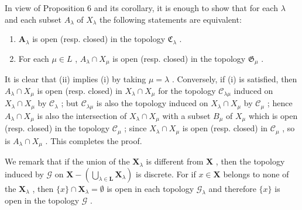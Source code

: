 In view of Proposition 6 and its corollary, it is enough to show that for each \(\lambda\) and each subset \(A_{\lambda}\) of \(X_{\lambda}\) the following statements are equivalent:

\begin{enumerate}
\def\labelenumi{(\roman{enumi})}
\item
  \(\mathbf{A}_{\lambda}\) is open (resp. closed) in the topology \(\mathfrak{C}_{\lambda}\) .
\item
  For each \(\mu \in L\) , \(A_{\lambda} \cap X_{\mu}\) is open (resp. closed) in the topology \(\mathfrak{G}_{\mu}\) .
\end{enumerate}

It is clear that (ii) implies (i) by taking \(\mu = \lambda\) . Conversely, if (i) is satisfied, then \(A_{\lambda} \cap X_{\mu}\) is open (resp. closed) in \(X_{\lambda} \cap X_{\mu}\) for the topology \(\mathcal{C}_{\lambda\mu}\) induced on \(X_{\lambda} \cap X_{\mu}\) by \(\mathcal{C}_{\lambda}\) ; but \(\mathcal{C}_{\lambda\mu}\) is also the topology induced on \(X_{\lambda} \cap X_{\mu}\) by \(\mathcal{C}_{\mu}\) ; hence \(A_{\lambda} \cap X_{\mu}\) is also the intersection of \(X_{\lambda} \cap X_{\mu}\) with a subset \(B_{\mu}\) of \(X_{\mu}\) which is open (resp. closed) in the topology \(\mathcal{C}_{\mu}\) ; since \(X_{\lambda} \cap X_{\mu}\) is open (resp. closed) in \(\mathcal{C}_{\mu}\) , so is \(A_{\lambda} \cap X_{\mu}\) . This completes the proof.

We remark that if the union of the \(\mathbf{X}_{\lambda}\) is different from \(\mathbf{X}\) , then the topology induced by \(\mathcal{G}\) on \(\mathbf{X} - \left(\bigcup_{\lambda \in \mathbf{L}} \mathbf{X}_{\lambda}\right)\) is discrete. For if \(x \in \mathbf{X}\) belongs to none of the \(\mathbf{X}_{\lambda}\) , then \(\{x\} \cap \mathbf{X}_{\lambda} = \emptyset\) is open in each topology \(\mathcal{G}_{\lambda}\) and therefore \(\{x\}\) is open in the topology \(\mathcal{G}\) .

